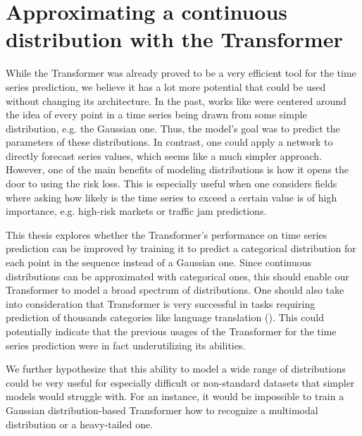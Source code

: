\documentclass[en]{pracamgr}
\begin{document}
\chapter{Approximating a continuous distribution with the Transformer}

While the Transformer was already proved to be a very efficient tool for the time series prediction, we believe it has a lot more potential that could be used without changing its architecture. In the past, works like \cite{enhancing} were centered around the idea of every point in a time series being drawn from some simple distribution, e.g. the Gaussian one. Thus, the model's goal was to predict the parameters of these distributions.
In contrast, one could apply a network to directly forecast series values, which seems like a much simpler approach. However, one of the main benefits of modeling distributions is how it opens the door to using the risk loss. This is especially useful when one considers fields where asking how likely is the time series to exceed a certain value is of high importance, e.g. high-risk markets or traffic jam predictions.

This thesis explores whether the Transformer's performance on time series prediction can be improved by training it to predict a categorical distribution for each point in the sequence instead of a Gaussian one. Since continuous distributions can be approximated with categorical ones, this should enable our Transformer to model a broad spectrum of distributions. One should also take into consideration that Transformer is very successful in tasks requiring prediction of thousands categories like language translation (\cite{tr}). This could potentially indicate that the previous usages of the Transformer for the time series prediction were in fact underutilizing its abilities.



We further hypothesize that this ability to model a wide range of distributions could be very useful for especially difficult or non-standard datasets that simpler models would struggle with. For an instance, it would be impossible to train a Gaussian distribution-based Transformer how to recognize a multimodal distribution or a heavy-tailed one.
\end{document}
